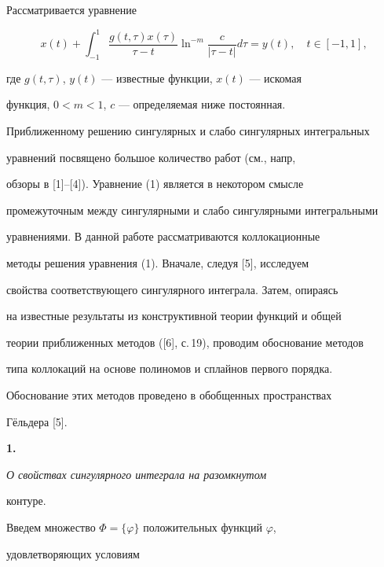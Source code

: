 \label{begin}








Рассматривается уравнение


\begin{equation}


x(t)+\int^1_{-1}\frac{g(t,\tau)x(\tau)}{\tau-t}


\ln^{-m}\frac{c}{|\tau-t|}d\tau=y(t),\quad t\in[-1,1],


\end{equation}


где $g(t,\tau)$, $y(t)$ --- известные функции, $x(t)$ --- искомая 


функция, $0<m<1$, $c$ --- определяемая ниже постоянная.





Приближенному решению сингулярных и слабо сингулярных интегральных 


уравнений посвящено большое количество работ (см., напр, 


обзоры в [1]--[4]). Уравнение (1) является в некотором смысле 


промежуточным между сингулярными и слабо сингулярными интегральными 


уравнениями. В данной работе рассматриваются коллокационные 


методы решения уравнения (1). Вначале, следуя [5], исследуем 


свойства соответствующего сингулярного интеграла. Затем, опираясь 


на известные результаты из конструктивной теории функций и общей 


теории приближенных методов ([6], с.\,19), проводим обоснование методов 


типа коллокаций на основе полиномов и сплайнов первого порядка. 


Обоснование этих методов проведено в обобщенных пространствах 


Г\"ельдера [5].


\medskip





{\bf 1.} {\it О свойствах сингулярного интеграла на разомкнутом 


контуре.}


Введем множество $\Phi=\{\varphi\}$ положительных функций $\varphi$, 


удовлетворяющих условиям





